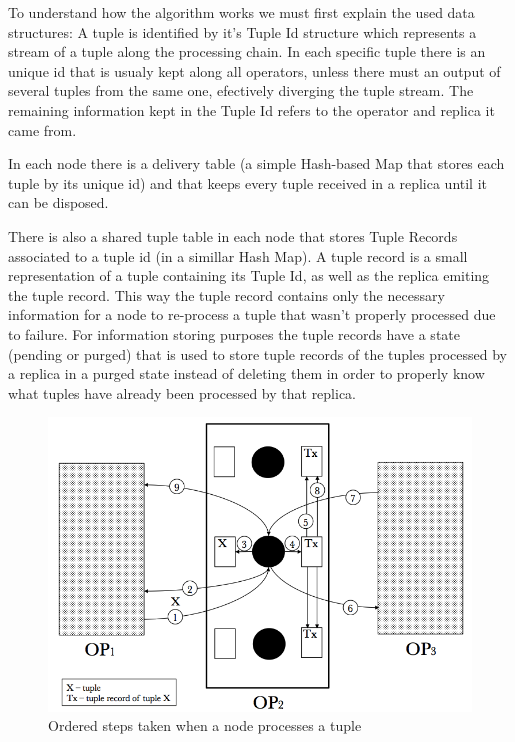 \documentclass[times, 10pt,twocolumn]{article}
\begin{document}


To understand how the algorithm works we must first explain the used data
structures: A tuple is identified by it's Tuple Id structure which
represents a stream of a tuple along the processing chain. In each
specific tuple there is an unique id that is usualy kept along all
operators, unless there must an output of several tuples from the same
one, efectively diverging the tuple stream.  The remaining information
kept in the Tuple Id refers to the operator and replica it came from. 

In each node there is a delivery table (a simple Hash-based Map that
stores each tuple by its unique id) and that keeps every tuple received in
a replica until it can be disposed.  

There is also a shared tuple table in each node that stores Tuple Records
associated to a tuple id (in a simillar Hash Map). A tuple record is a
small representation of a tuple containing its Tuple Id, as well as the
replica emiting the tuple record. This way the tuple record contains only
the necessary information for a node to re-process a tuple that wasn't
properly processed due to failure. For information storing purposes the
tuple records have a state (pending or purged) that is used to store tuple
records of the tuples processed by a replica in a purged state instead of
deleting them in order to properly know what tuples have already been
processed by that replica.



\begin{figure}[h] \includegraphics[width=\columnwidth]{semantics}
	\caption{Ordered steps taken when a node processes a tuple} \end{figure}
\end{document}
